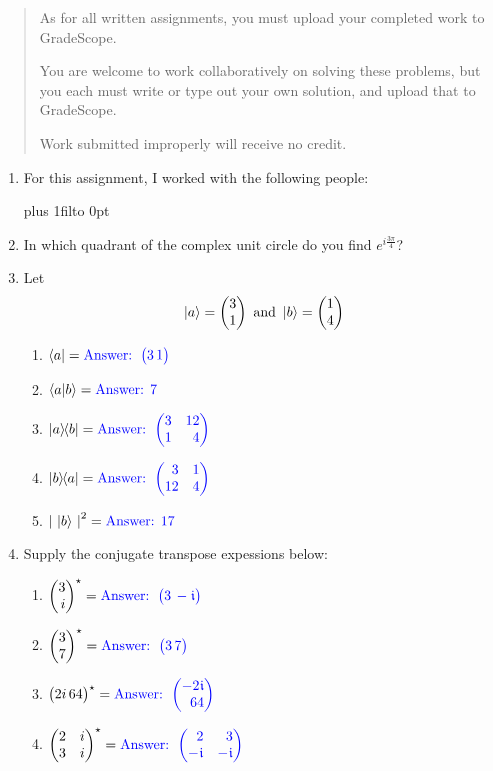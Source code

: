 \documentclass[12pt]{article}
\def\DefaultSpace{1in}
\newcommand{\LeaveSpace}[1][\DefaultSpace]{%
\vskip #1 plus 1fil\relax\hbox to 0pt{\hss} %
}
\begin{document}

\begin{quote}
    As for all written assignments, you must upload your completed work to GradeScope.

    You are welcome to work collaboratively on solving these problems, but you each must write or type out your own solution, and upload that to GradeScope.

    Work submitted improperly will receive no credit.
\end{quote}

\begin{enumerate}[font=\bfseries]
    \item For this assignment, I worked with the following people:

    \LeaveSpace{}
    \item {} In which quadrant of the complex unit circle do you find $e^{i\frac{3\pi}{4}}$? 
    \item {} Let
    \[ \ket{a} = \SQB{3}{1} \mbox{ and } \ket{b} = \SQB{1}{4} \]
    \begin{enumerate}[label=\theenumi.\arabic*]
        \item $\bra{a}=\Ans{\CQB{3}{1}}$
        \item $\braket{a|b}={\color{blue}\mbox{Answer: }7}$
        \item $\ket{a}\kern-3pt\bra{b}=\Ans{\SQBG{\relax}{3}{12}{1}{4}}$
        \item $\ket{b}\kern-3pt\bra{a}=\Ans{\SQBG{\relax}{3}{1}{12}{4}}$
        \item ${{|\,\ket{b}\,|}}^{2}={\color{blue}\mbox{Answer: }17}$
    \end{enumerate}


    \item {} Supply the conjugate transpose expessions below:
    \begin{enumerate}[label=\theenumi.\arabic*]
       \item $\Conj{\SQB{3}{i}}=\Ans{\CQB{3}{-\NiceI}}$ 
       \item $\Conj{\SQB{3}{7}}=\Ans{\CQB{3}{7}}$  
       \item $\Conj{\CQB{2i}{64}}=\Ans{\SQB{-2\NiceI}{64}}$
       \item $\Conj{\SQBG{\relax}{2}{i}{3}{i}}=\Ans{\SQBG{\relax}{2}{3}{-\NiceI}{-\NiceI}}$ 
    \end{enumerate}


\end{enumerate}
\end{document}
